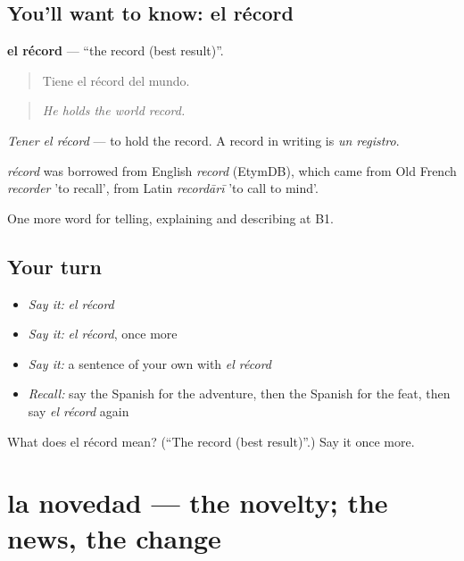 \subsection*{You'll want to know: el récord}
\textbf{el récord} — \textquotedblleft{}the record (best result)\textquotedblright{}.

\begin{quote}
Tiene el récord del mundo.
\end{quote}

\begin{quote}
\emph{He holds the world record.}
\end{quote}

\emph{Tener el récord} — to hold the record. A record in writing is \emph{un registro}.

\begin{cousinweb}
\emph{récord} was borrowed from English \emph{record} (EtymDB), which came from Old French \emph{recorder} 'to recall', from Latin \emph{recordārī} 'to call to mind'.
\end{cousinweb}

\begin{grammarlens}[title={What you've built}]
One more word for telling, explaining and describing at B1.
\end{grammarlens}

\subsection*{Your turn}
\begin{itemize}
\raggedright
  \item \emph{Say it:} \emph{el récord}
  \item \emph{Say it:} \emph{el récord}, once more
  \item \emph{Say it:} a sentence of your own with \emph{el récord}
  \item \emph{Recall:} say the Spanish for the adventure, then the Spanish for the feat, then say \emph{el récord} again
\end{itemize}

\begin{tcolorbox}[breakable,colback=teal!4,colframe=teal!35!black,title={Before you move on}]
What does el récord mean? (\textquotedblleft{}The record (best result)\textquotedblright{}.) Say it once more.
\end{tcolorbox}
\section[la novedad]{la novedad — the novelty; the news, the change}

